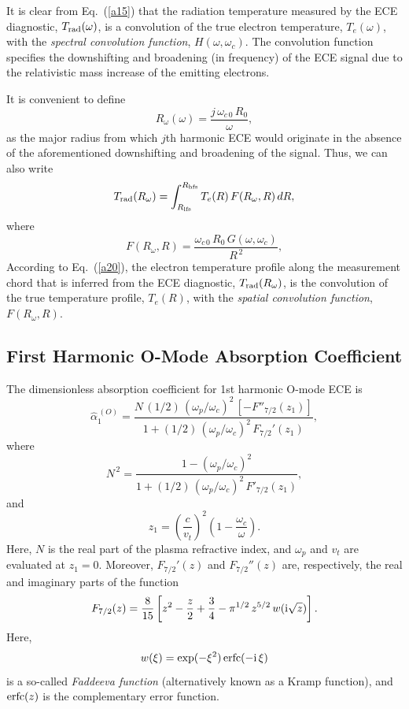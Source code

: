 \documentclass[12pt,prb,aps]{revtex4-1}
\begin{document}
 It is clear from Eq.~(\ref{a15}) that the radiation temperature measured by the ECE diagnostic, $T_{\rm rad}(\omega)$,  is a convolution of the true
electron temperature, $T_e(\omega)$,  with the {\em spectral convolution function}, $H(\omega,\omega_c)$. The convolution function specifies the downshifting and broadening   (in frequency) of the ECE
signal due to the relativistic mass increase of the emitting electrons.

It is convenient to define
\begin{equation}
R_\omega(\omega) = \frac{j\,\omega_{c\,0}\,R_0}{\omega},
\end{equation}
as the major radius from which $j$th harmonic ECE would originate in the absence of the aforementioned downshifting and broadening of the signal. 
Thus, we can also write
\begin{equation}\label{a20}
T_{\rm rad}(R_\omega) = \int_{R_{\rm lfs}}^{R_{\rm hfs}}T_e(R)\,F(R_\omega,R)\,dR,
\end{equation}
where
\begin{equation}
F(R_\omega,R) = \frac{\omega_{c\,0}\,R_0\,G(\omega,\omega_c)}{R^{\,2}},
\end{equation}
According to Eq.~(\ref{a20}), the electron temperature profile along the measurement chord that is inferred from the ECE diagnostic, $T_{\rm rad}(R_\omega)$,
is the convolution of the true temperature profile, $T_e(R)$, with the {\em spatial convolution function}, $F(R_\omega,R)$.

\subsection{First Harmonic O-Mode Absorption Coefficient} 
The dimensionless absorption coefficient for 1st harmonic O-mode ECE is\,\cite{bornatici}
\begin{equation}\label{a22}
\hat{\alpha}_1^{\,(O)}=\frac{N\,(1/2)\,(\omega_p/\omega_c)^2\,[-F''_{7/2}(z_1)]}{1+(1/2)\,(\omega_p/\omega_c)^2\,F_{7/2}'(z_1)},
\end{equation}
where
\begin{equation}
N^{\,2}=\frac{1-(\omega_p/\omega_c)^2}{1+(1/2)\,(\omega_p/\omega_c)^2\,F'_{7/2}(z_1)},
\end{equation}
and
\begin{equation}\label{a24}
z_1=\left(\frac{c}{v_t}\right)^2\left(1-\frac{\omega_c}{\omega}\right).
\end{equation}
Here, $N$ is the real part of the plasma refractive index, and $\omega_p$ and $v_t$ are evaluated at $z_1=0$. Moreover,
$F_{7/2}'(z)$ and $F_{7/2}''(z)$ are, respectively,  the real and imaginary parts of
the function\,\cite{bornatici}
\begin{equation}
F_{7/2}(z) =\frac{8}{15}\left[z^2-\frac{z}{2}+\frac{3}{4}-\pi^{1/2}\,z^{5/2}\,w({\rm i}\sqrt{z})\right].
\end{equation}
Here,
\begin{equation}
w(\xi)= \exp(-\xi^2)\,{\rm erfc}(-{\rm i}\,\xi)
\end{equation}
is a so-called {\em Faddeeva function}\/ (alternatively known as a Kramp function),  and 
${\rm erfc}(z)$ is the complementary error function.\cite{as} 
\end{document}
